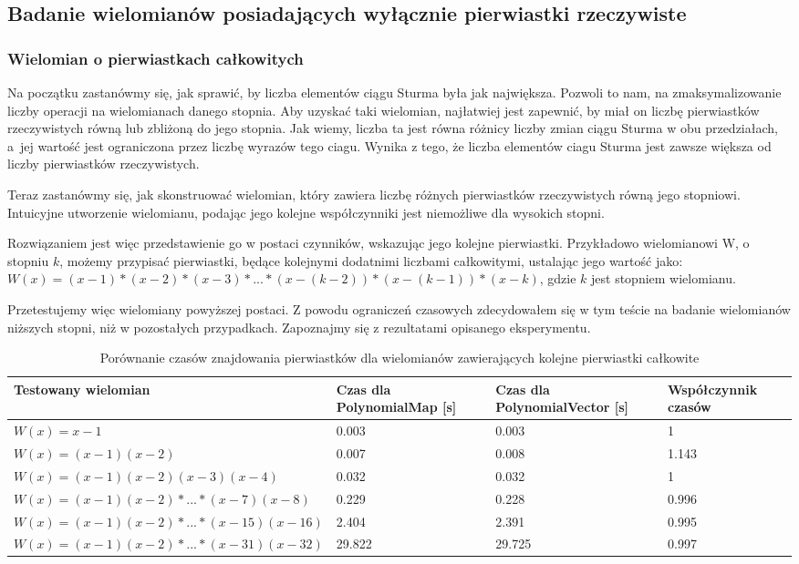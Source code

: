\subsection{Badanie wielomianów posiadających wyłącznie pierwiastki rzeczywiste}

\subsubsection{Wielomian o pierwiastkach całkowitych}

Na początku zastanówmy się, jak sprawić, by liczba elementów ciągu Sturma była jak największa. Pozwoli to nam, na zmaksymalizowanie liczby operacji na wielomianach danego stopnia. Aby uzyskać taki wielomian, najłatwiej jest zapewnić, by miał on liczbę pierwiastków rzeczywistych równą lub zbliżoną do jego stopnia. Jak wiemy, liczba ta jest równa różnicy liczby zmian ciągu Sturma w obu przedziałach, a~jej wartość jest ograniczona przez liczbę wyrazów tego ciagu. Wynika z tego, że liczba elementów ciagu Sturma jest zawsze większa od liczby pierwiastków rzeczywistych.

Teraz zastanówmy się, jak skonstruować wielomian, który zawiera liczbę różnych pierwiastków rzeczywistych równą jego stopniowi. Intuicyjne utworzenie wielomianu, podając jego kolejne współczynniki jest niemożliwe dla wysokich stopni.

Rozwiązaniem jest więc przedstawienie go w postaci czynników, wskazując jego kolejne pierwiastki. Przykładowo wielomianowi W, o stopniu $k$, możemy przypisać pierwiastki, będące kolejnymi dodatnimi liczbami całkowitymi, ustalając jego wartość jako: \\ $W(x)=(x-1)*(x-2)*(x-3)*...*(x-(k-2))*(x-(k-1))*(x-k)$, gdzie $k$ jest stopniem wielomianu.

Przetestujemy więc wielomiany powyższej postaci. Z powodu ograniczeń czasowych zdecydowałem się w tym teście na badanie wielomianów niższych stopni, niż w pozostałych przypadkach. Zapoznajmy się z rezultatami opisanego eksperymentu.

\begin{table}[H]
	\begin{tabular}{ |p{4cm}|p{2.75cm}|p{2.75cm}|p{3.5cm}|} 
		\hline
		Testowany wielomian & Czas dla PolynomialMap [s] & Czas dla PolynomialVector [s] & Współczynnik czasów \\
		\hline
		$W(x) = x-1$ & 0.003 & 0.003 & 1 \\
		$W(x) = (x-1)(x-2)$ & 0.007 & 0.008 & 1.143 \\
		$W(x) = (x-1)(x-2)(x-3)(x-4)$ & 0.032 & 0.032 & 1 \\
		$W(x) = (x-1)(x-2)*...*(x-7)(x-8)$ & 0.229 & 0.228 & 0.996 \\
		$W(x) = (x-1)(x-2)*...*(x-15)(x-16)$ & 2.404 & 2.391 & 0.995 \\
		$W(x) = (x-1)(x-2)*...*(x-31)(x-32)$ & 29.822 & 29.725 & 0.997 \\
		\hline
	\end{tabular}
	\caption{Porównanie czasów znajdowania pierwiastków dla wielomianów zawierających kolejne pierwiastki całkowite}
\end{table}

